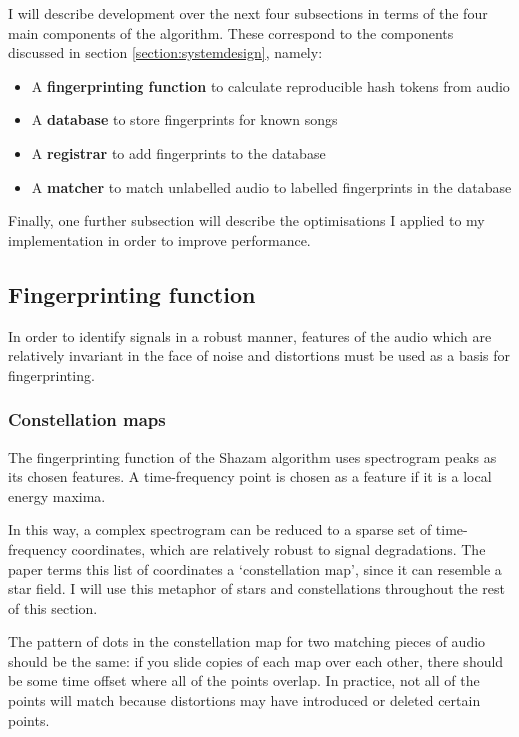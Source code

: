 \documentclass[12pt,a4paper,twoside,openright]{report}
\begin{document}
I will describe development over the next four subsections in terms of the four main components of the algorithm. These correspond to the components discussed in section \ref{section:systemdesign}, namely: 

\begin{itemize}
  \item A \textbf{fingerprinting function} to calculate reproducible hash tokens from audio
  \item A \textbf{database} to store fingerprints for known songs
  \item A \textbf{registrar} to add fingerprints to the database
  \item A \textbf{matcher} to match unlabelled audio to labelled fingerprints in the database
\end{itemize}

Finally, one further subsection will describe the optimisations I applied to my implementation in order to improve performance.

\subsection{Fingerprinting function}

In order to identify signals in a robust manner, features of the audio which are relatively invariant in the face of noise and distortions must be used as a basis for fingerprinting.

\subsubsection{Constellation maps}

The fingerprinting function of the Shazam algorithm uses spectrogram peaks as its chosen features. A time-frequency point is chosen as a feature if it is a local energy maxima.

In this way, a complex spectrogram can be reduced to a sparse set of time-frequency coordinates, which are relatively robust to signal degradations. The paper terms this list of coordinates a `constellation map', since it can resemble a star field. I will use this metaphor of stars and constellations throughout the rest of this section.

The pattern of dots in the constellation map for two matching pieces of audio should be the same: if you slide copies of each map over each other, there should be some time offset where all of the points overlap. In practice, not all of the points will match because distortions may have introduced or deleted certain points.
\end{document}
